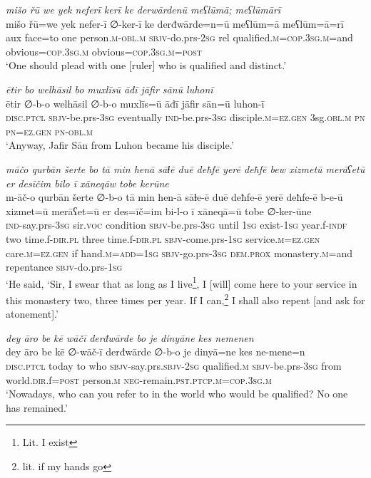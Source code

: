\ea \label{ŠJ.92}
\textit{mišo řū we yek neferī kerī ke derwārdenū meʕlūmā; meʕlūmārī} \\ 
\gll mišo řū=we yek nefer-ī ∅-ker-ī ke derđwārde=n=ū meʕlūm=ā meʕlūm=ā=rī \\ 
 aux face=to one person\textsc{.m}\textsc{-obl}\textsc{.m} \textsc{sbjv-}do.prs-\textsc{2sg} rel qualified\textsc{.m}\textsc{=cop}\textsc{.3sg}\textsc{.m}=and obvious\textsc{=cop}\textsc{.3sg}\textsc{.m} obvious\textsc{=cop}\textsc{.3sg}\textsc{.m}\textsc{=\textsc{post}} \\ 
\glt `One should plead with one [ruler] who is qualified and distinct.'
\z 
 
\ea \label{ŠJ.97}
\textit{ētir bo welhāsil bo muxlīsū āđī jāfir sānū luhonī} \\ 
\gll ētir ∅-b-o welhāsil ∅-b-o muxlīs=ū āđī jāfir sān=ū luhon-ī \\ 
 \textsc{disc.ptcl} \textsc{sbjv-}be.prs\textsc{-3sg} eventually \textsc{ind-}be.prs\textsc{-3sg} disciple\textsc{.m}\textsc{=ez.gen} 3sg\textsc{.obl}\textsc{.m} \textsc{pn} \textsc{pn}\textsc{=ez.gen} \textsc{pn}\textsc{-obl}\textsc{.m} \\ 
\glt `Anyway, Jafir Sān from Luhon became his disciple.'
\z 
 
\ea \label{ŠJ.98}
\textit{māčo qurbān šerte bo tā min henā sāɫē duē deħfē yerē deħfē bew xizmetū merāʕetū er desīčim bilo ī xāneqāw tobe kerūne} \\ 
\gll m-āč-o qurbān šerte ∅-b-o tā min hen-ā sāɫe-ē duē deħfe-ē yerē deħfe-ē b-e-ū xizmet=ū merāʕet=ū er des=īč=im bi-l-o ī xāneqā=ū tobe ∅-ker-ūne \\ 
 \textsc{ind-}say.prs\textsc{-3sg} sir.\textsc{voc} condition \textsc{sbjv-}be.prs\textsc{-3sg} until \textsc{1sg} exist\textsc{-\textsc{1sg}} year.f\textsc{-indf} two time.f\textsc{-dir}\textsc{.pl} three time.f\textsc{-dir}\textsc{.pl} \textsc{sbjv-}come.prs\textsc{-\textsc{1sg}} service\textsc{.m}\textsc{=ez.gen} care\textsc{.m}\textsc{=ez.gen} if hand\textsc{.m}\textsc{=add}\textsc{=\textsc{1sg}} \textsc{sbjv-}go.prs\textsc{-3sg} \textsc{dem.prox} monastery\textsc{.m}=and repentance \textsc{sbjv-}do.prs\textsc{-\textsc{1sg}} \\ 
\glt `He said, ‘Sir, I swear that as long as I live\footnote{Lit. I exist}, I [will] come here to your service in this monastery two, three times per year. If I can,\footnote{lit. if my hands go} I shall also repent [and ask for atonement].'
\z 
 
\ea \label{ŠJ.101}
\textit{dey āro be kē wāčī derđwārde bo je dinyāne kes nemenen} \\ 
\gll dey āro be kē ∅-wāč-ī derđwārde ∅-b-o je dinyā=ne kes ne-mene=n \\ 
 \textsc{disc.ptcl} today to who \textsc{sbjv-}say.prs.\textsc{sbjv-}\textsc{2sg} qualified\textsc{.m} \textsc{sbjv-}be.prs\textsc{-3sg} from world\textsc{.dir}.f\textsc{=\textsc{post}} person\textsc{.m} \textsc{neg-}remain\textsc{.pst}\textsc{.ptcp}\textsc{.m}\textsc{=cop}\textsc{.3sg}\textsc{.m} \\ 
\glt `Nowadays, who can you refer to in the world who would be qualified? No one has remained.'
\z 
 
